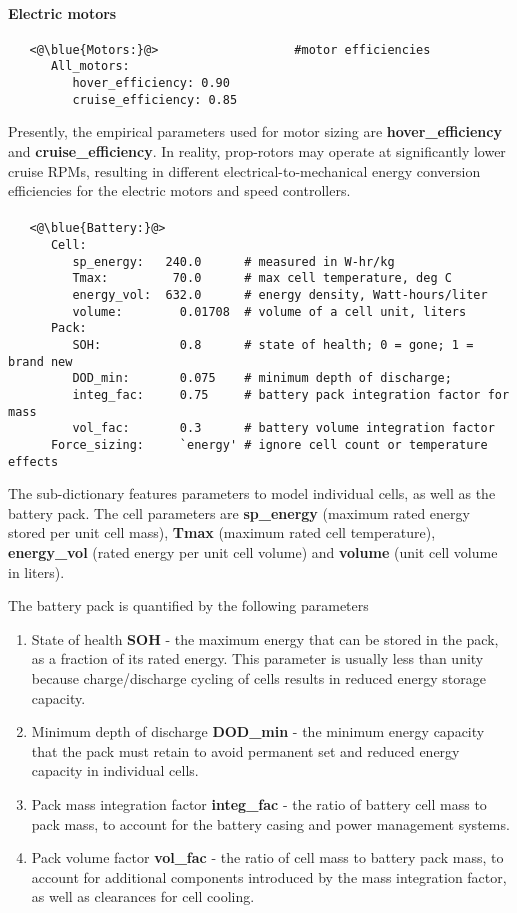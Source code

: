 \paragraph{Electric motors}
\begin{lstlisting}
   <@\blue{Motors:}@>					#motor efficiencies
      All_motors:
         hover_efficiency: 0.90
         cruise_efficiency: 0.85
\end{lstlisting}

Presently, the empirical parameters used for motor sizing are \textbf{hover\_efficiency} and \textbf{cruise\_efficiency}. In reality, prop-rotors may operate at significantly lower cruise RPMs, resulting in different electrical-to-mechanical energy conversion efficiencies for the electric motors and speed controllers. 

\paragraph{}
\begin{lstlisting}
   <@\blue{Battery:}@>
      Cell:
         sp_energy:   240.0      # measured in W-hr/kg
         Tmax:         70.0      # max cell temperature, deg C
         energy_vol:  632.0      # energy density, Watt-hours/liter
         volume:        0.01708  # volume of a cell unit, liters
      Pack:
         SOH:           0.8      # state of health; 0 = gone; 1 = brand new
         DOD_min:       0.075    # minimum depth of discharge;
         integ_fac:     0.75     # battery pack integration factor for mass 
         vol_fac:       0.3      # battery volume integration factor 
      Force_sizing:     `energy' # ignore cell count or temperature effects      
\end{lstlisting}
The  sub-dictionary features parameters to model individual cells, as well as the battery pack. The cell parameters are \textbf{sp\_energy} (maximum rated energy stored per unit cell mass), \textbf{Tmax} (maximum rated cell temperature), \textbf{energy\_vol} (rated energy per unit cell volume) and \textbf{volume} (unit cell volume in liters).

The battery pack is quantified by the following parameters
\begin{enumerate}
\item State of health \textbf{SOH} - the maximum energy that can be stored in the pack, as a fraction of its rated energy. This parameter is usually less than unity because charge/discharge cycling of cells results in reduced energy storage capacity.
\item Minimum depth of discharge \textbf{DOD\_min} - the minimum energy capacity that the pack must retain to avoid permanent set and reduced energy capacity in individual cells. 
\item Pack mass integration factor \textbf{integ\_fac} - the ratio of battery cell mass to pack mass, to account for the battery casing and power management systems.
\item Pack volume factor \textbf{vol\_fac} - the ratio of cell mass to battery pack mass, to account for additional components introduced by the mass integration factor, as well as clearances for cell cooling.
\end{enumerate}

